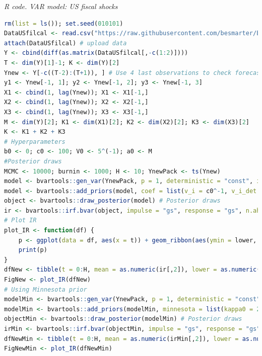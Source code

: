 \begin{tcolorbox}[enhanced,width=4.67in,center upper,
	fontupper=\large\bfseries,drop shadow southwest,sharp corners]
	\textit{R code. VAR model: US fiscal shocks}
	\begin{VF}
		\begin{lstlisting}[language=R]
rm(list = ls()); set.seed(010101)
DataUSfilcal <- read.csv("https://raw.githubusercontent.com/besmarter/BSTApp/refs/heads/master/DataApp/18USAfiscal.csv", sep = ",", header = TRUE, quote = "")
attach(DataUSfilcal) # upload data
Y <- cbind(diff(as.matrix(DataUSfilcal[,-c(1:2)])))
T <- dim(Y)[1]-1; K <- dim(Y)[2]
Ynew <- Y[-c((T-2):(T+1)), ] # Use 4 last observations to check forecast
y1 <- Ynew[-1, 1]; y2 <- Ynew[-1, 2]; y3 <- Ynew[-1, 3]
X1 <- cbind(1, lag(Ynew)); X1 <- X1[-1,]
X2 <- cbind(1, lag(Ynew)); X2 <- X2[-1,]
X3 <- cbind(1, lag(Ynew)); X3 <- X3[-1,]
M <- dim(Y)[2]; K1 <- dim(X1)[2]; K2 <- dim(X2)[2]; K3 <- dim(X3)[2] 
K <- K1 + K2 + K3
# Hyperparameters
b0 <- 0; c0 <- 100; V0 <- 5^(-1); a0 <- M
#Posterior draws
MCMC <- 10000; burnin <- 1000; H <- 10; YnewPack <- ts(Ynew)
model <- bvartools::gen_var(YnewPack, p = 1, deterministic = "const", iterations = MCMC, burnin = burnin) # Create model
model <- bvartools::add_priors(model, coef = list(v_i = c0^-1, v_i_det = c0^-1, const = b0), sigma = list(df = a0, scale = V0/a0), coint_var = FALSE) # Add priors
object <- bvartools::draw_posterior(model) # Posterior draws
ir <- bvartools::irf.bvar(object, impulse = "gs", response = "gs", n.ahead = H, type = "feir", cumulative = FALSE) # Calculate IR
# Plot IR
plot_IR <- function(df) {
	p <- ggplot(data = df, aes(x = t)) + geom_ribbon(aes(ymin = lower, ymax = upper), alpha = 1, fill = "lightblue") + geom_line(aes(y = mean), colour = "blue", linewidth = 0.5) + ylab("Impulse response") + xlab("Time") + xlim(0,H)
	print(p)
}
dfNew <- tibble(t = 0:H, mean = as.numeric(ir[,2]), lower = as.numeric(ir[,1]), upper = as.numeric(ir[,3]))
FigNew <- plot_IR(dfNew)
# Using Minnesota prior
modelMin <- bvartools::gen_var(YnewPack, p = 1, deterministic = "const", iterations = MCMC, burnin = burnin)
modelMin <- bvartools::add_priors(modelMin, minnesota = list(kappa0 = 2, kappa1 = 0.5, kappa3 = 5), coint_var = FALSE) # Minnesota prior
objectMin <- bvartools::draw_posterior(modelMin) # Posterior draws
irMin <- bvartools::irf.bvar(objectMin, impulse = "gs", response = "gs", n.ahead = H, type = "feir", cumulative = FALSE) # Calculate IR
dfNewMin <- tibble(t = 0:H, mean = as.numeric(irMin[,2]), lower = as.numeric(irMin[,1]), upper = as.numeric(irMin[,3]))
FigNewMin <- plot_IR(dfNewMin)
\end{lstlisting}
	\end{VF}
\end{tcolorbox} 

